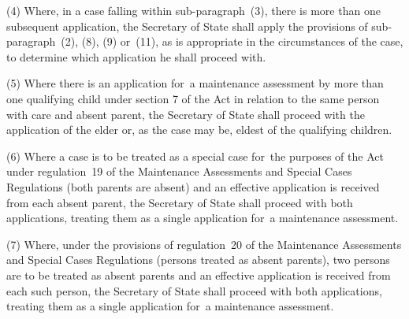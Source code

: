\documentclass[a4paper,12pt]{article}
\begin{document}
(4) Where, in a case falling within sub-paragraph~(3), there is more than one subsequent application, 
the Secretary of State  %
shall apply the provisions of sub-paragraph~(2), (8), (9) or~(11), as is appropriate in the circumstances of the case, to determine which application he shall proceed with.

(5) Where there is an application for~a maintenance assessment by more than one qualifying child under section 7 of the Act in relation to the same person with care and absent parent, 
the Secretary of State  %
shall proceed with the application of the elder or, as the case may be, eldest of the qualifying children.

(6) Where a case is to be treated as a special case for~the purposes of the Act under regulation~19 of the Maintenance Assessments and Special Cases Regulations (both parents are absent) and an effective application is received from each absent parent, 
the Secretary of State  %
shall proceed with both applications, treating them as a single application for~a maintenance assessment.

(7) Where, under the provisions of regulation~20 of the Maintenance Assessments and Special Cases Regulations (persons treated as absent parents), two persons are to be treated as absent parents and an effective application is received from each such person, 
the Secretary of State  %
shall proceed with both applications, treating them as a single application for~a maintenance assessment.

\end{document}

